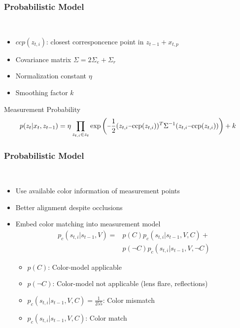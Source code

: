 \begin{frame}
  \frametitle{Probabilistic Model}
  \begin{description}[]
  \item[Measurement Model Computation] \hfill \\
  \begin{itemize}
  \item $ccp(z_{t,i})$: closest corresponcence point in $z_{t-1}+x_{t,p}$
  \pause
  \item Covariance matrix $\Sigma = 2\Sigma_e+\Sigma_r$
  \pause
  \item Normalization constant $\eta$
  \item Smoothing factor $k$
  \end{itemize}
  \end{description}     
  \begin{block}{Measurement Probability}
  \small
  $$
  p(z_t|x_t,z_{t-1}) =
  \eta\prod\limits_{z_{t,i}\in z_t}
  \mathrm{exp}\left(\unaryminus\frac{1}{2}(z_{t,i}\unaryminus\mathrm{ccp}(z_{t,i}))^T\Sigma^{\unaryminus 1}(z_{t,i}\unaryminus\mathrm{ccp}(z_{t,i}))\right)+k
  \nonumber
  $$
  \end{block}
\end{frame}

\begin{frame}
  \frametitle{Probabilistic Model}
  \begin{description}[]
  \item[Adding Color] \hfill \\
  \begin{itemize}
  \item Use available color information of measurement points
  \item Better alignment despite occlusions
  \item Embed color matching into measurement model
  \begin{align}
p_c(s_{t,i}|s_{t-1},V)
  = &p(C)p_c(s_{t,i}|s_{t-1},V,C)+ \nonumber\\
&p(\neg C)p_c(s_{t,i}|s_{t-1},V,\neg C)\nonumber
  \end{align}
  \begin{itemize}
  \item $p(C)$: Color-model applicable
  \item $p(\neg C)$: Color-model not applicable (lens flare, reflections)
  \item $p_c(s_{t,i}|s_{t-1},V,C)=\frac{1}{255}$: Color mismatch
  \item $p_c(s_{t,i}|s_{t-1},V,C)$: Color match
  \end{itemize}
  \end{itemize}
  \end{description}
\end{frame}

